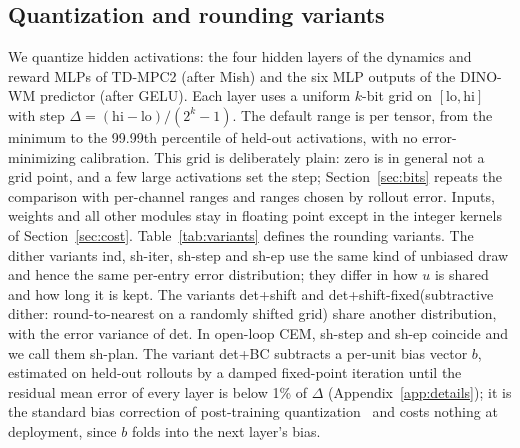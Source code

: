 \documentclass[10pt]{article}
\newcommand{\dtm}{\textsf{det}\xspace}
\newcommand{\detbc}{\textsf{det+BC}\xspace}
\newcommand{\shiter}{\textsf{sh-iter}\xspace}
\newcommand{\shstep}{\textsf{sh-step}\xspace}
\newcommand{\shep}{\textsf{sh-ep}\xspace}
\newcommand{\shplan}{\textsf{sh-plan}\xspace}
\newcommand{\detshift}{\textsf{det+shift}\xspace}
\newcommand{\detshiftfix}{\textsf{det+shift-fixed}\xspace}
\newcommand{\ind}{\textsf{ind}\xspace}
\begin{document}
\subsection{Quantization and rounding variants}
\label{sec:variants}
We quantize hidden activations: the four hidden layers of the dynamics and reward MLPs of TD-MPC2 (after Mish) and the six MLP outputs of the DINO-WM predictor (after GELU). Each layer uses a uniform $k$-bit grid on $[\mathrm{lo},\mathrm{hi}]$ with step $\Delta=(\mathrm{hi}-\mathrm{lo})/(2^k-1)$. The default range is per tensor, from the minimum to the 99.99th percentile of held-out activations, with no error-minimizing calibration. This grid is deliberately plain: zero is in general not a grid point, and a few large activations set the step; Section~\ref{sec:bits} repeats the comparison with per-channel ranges and ranges chosen by rollout error. Inputs, weights and all other modules stay in floating point except in the integer kernels of Section~\ref{sec:cost}. Table~\ref{tab:variants} defines the rounding variants. The dither variants \ind, \shiter, \shstep and \shep use the same kind of unbiased draw and hence the same per-entry error distribution; they differ in how $u$ is shared and how long it is kept. The variants \detshift and \detshiftfix (subtractive dither: round-to-nearest on a randomly shifted grid) share another distribution, with the error variance of \dtm. In open-loop CEM, \shstep and \shep coincide and we call them \shplan. The variant \detbc subtracts a per-unit bias vector $b$, estimated on held-out rollouts by a damped fixed-point iteration until the residual mean error of every layer is below 1\% of $\Delta$ (Appendix~\ref{app:details}); it is the standard bias correction of post-training quantization~\citep{nagel2019dfq} and costs nothing at deployment, since $b$ folds into the next layer's bias.
\end{document}
